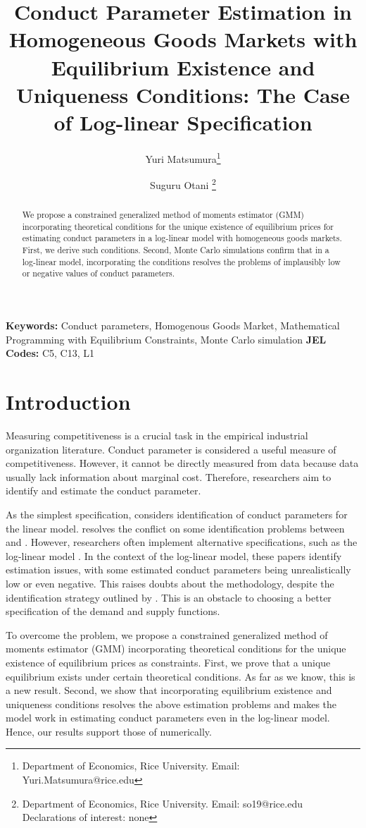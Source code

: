 \documentclass[11pt, a4paper]{article}
\title{Conduct Parameter Estimation in Homogeneous Goods Markets with Equilibrium Existence and Uniqueness Conditions: The Case of Log-linear Specification}
\author{Yuri Matsumura\thanks{Department of Economics, Rice University. Email: Yuri.Matsumura@rice.edu} \and Suguru Otani \thanks{Department of Economics, Rice University. Email: so19@rice.edu
\\Declarations of interest: none %
}}
\begin{document}
\maketitle
\begin{abstract}
    We propose a constrained generalized method of moments estimator (GMM) incorporating theoretical conditions for the unique existence of equilibrium prices for estimating conduct parameters in a log-linear model with homogeneous goods markets. 
    First, we derive such conditions.
    Second, Monte Carlo simulations confirm that in a log-linear model, incorporating the conditions resolves the problems of implausibly low or negative values of conduct parameters.
\end{abstract}

\noindent\textbf{Keywords:} Conduct parameters, Homogenous Goods Market, Mathematical Programming with Equilibrium Constraints, Monte Carlo simulation
\vspace{0in}
\newline
\noindent\textbf{JEL Codes:} C5, C13, L1

\bigskip

\section{Introduction}
Measuring competitiveness is a crucial task in the empirical industrial organization literature.
Conduct parameter is considered a useful measure of competitiveness. 
However, it cannot be directly measured from data because data usually lack information about marginal cost.
Therefore, researchers aim to identify and estimate the conduct parameter.

As the simplest specification, \citet{bresnahan1982oligopoly} considers identification of conduct parameters for the linear model. \cite{matsumura2023resolving} resolves the conflict on some identification problems between \cite{bresnahan1982oligopoly} and \cite{perloff2012collinearity}. 
However, researchers often implement alternative specifications, such as the log-linear model \citep{okazaki2022excess,merel2009measuring}. 
In the context of the log-linear model, these papers identify estimation issues, with some estimated conduct parameters being unrealistically low or even negative.
This raises doubts about the methodology, despite the identification strategy outlined by \citet{lau1982identifying}.
This is an obstacle to choosing a better specification of the demand and supply functions.

To overcome the problem, we propose a constrained generalized method of moments estimator (GMM) incorporating theoretical conditions for the unique existence of equilibrium prices as constraints. 
First, we prove that a unique equilibrium exists under certain theoretical conditions. 
As far as we know, this is a new result.
Second, we show that incorporating equilibrium existence and uniqueness conditions resolves the above estimation problems and makes the model work in estimating conduct parameters even in the log-linear model. 
Hence, our results support those of \cite{lau1982identifying} numerically.
\end{document}
